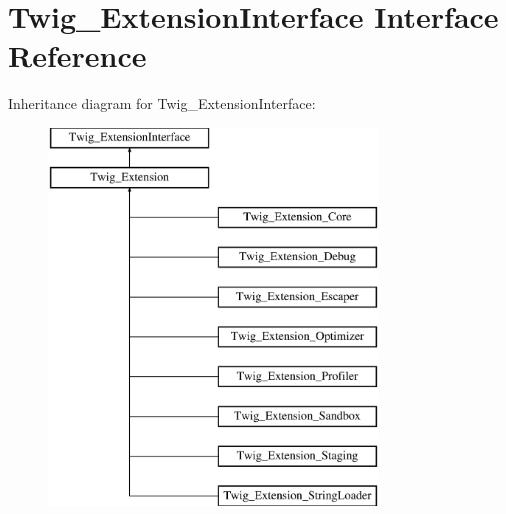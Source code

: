 \hypertarget{interface_twig___extension_interface}{}\section{Twig\+\_\+\+Extension\+Interface Interface Reference}
\label{interface_twig___extension_interface}
Inheritance diagram for Twig\+\_\+\+Extension\+Interface\+:\begin{figure}[H]
\begin{center}
\leavevmode
\includegraphics[height=10.000000cm]{interface_twig___extension_interface}
\end{center}
\end{figure}
